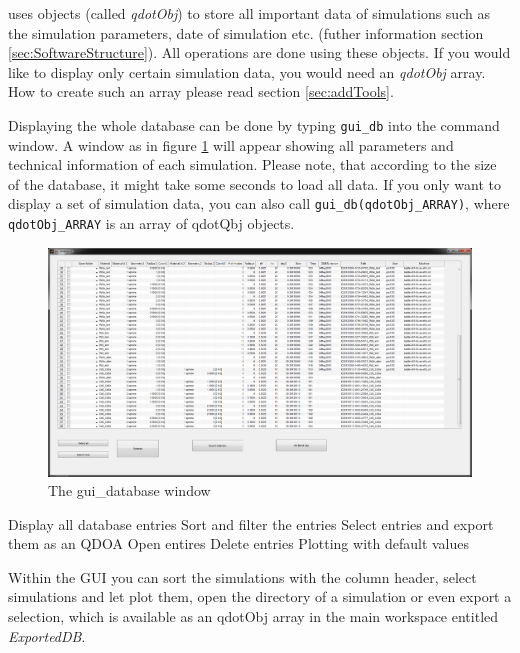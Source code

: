 			\begin{REMARK}
				\software uses objects (called {\it qdotObj}) to store all important data of simulations such as the simulation parameters, date of simulation etc.
				(futher information section \ref{sec:SoftwareStructure}). All operations are done using these objects. If you would like to display only
				certain simulation data, you would need an {\it qdotObj} array. How to create such an array please read section \ref{sec:addTools}.
			\end{REMARK}
			
			Displaying the whole database can be done by typing \lstinline{gui_db}  into the \matlab command window. A window as in figure \ref{fig:gui_database} will appear
			showing all parameters and technical information of each simulation. Please note, that according to the size of the database, it might take some seconds
			to load all data.
			If you only want to display a set of simulation data, you can also call \lstinline{gui_db(qdotObj_ARRAY)}, where \lstinline{qdotObj_ARRAY} is an array of qdotQbj objects.
			
			\begin{figure}[htbp]
				\centering
				\includegraphics[width=\textwidth]{Fig/Scrn_gui_database.png}
				\caption{The gui\_database window}
				\label{fig:gui_database}
			\end{figure}
			
			Display all database entries
                             Sort and filter the entries
                             Select entries and export them as an QDOA
                             Open entires
                             Delete entries
                             Plotting with default values
			
			Within the \gls{GUI} you can sort the simulations with the column header, select simulations and let plot them, open the directory of a simulation or 
			even export a selection, which is available as an qdotObj array in the main workspace entitled {\it ExportedDB}.



